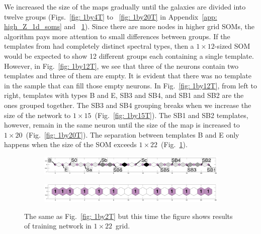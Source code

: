             We increased the size of the maps gradually until the galaxies are divided into twelve groups (Figs.~\ref{fig: 1by4T} to ~\ref{fig: 1by20T} in Appendix~\ref{app: high_Z_1d_soms} and ~\ref{fig: 1by22T}).
            Since there are more nodes in higher grid SOMs, the algorithm 
            pays more attention to small differences between groups.
            If the templates from  had completely distinct spectral types, then a $1\times12$-sized SOM would be expected to show 12 different groups each containing a single template.
            However, in Fig.~\ref{fig: 1by12T}, we see that three of the neurons contain two templates and three of them are empty.
            It is evident that there was no template in the  sample that can fill those empty neurons.
            In Fig.~\ref{fig: 1by12T}, from left to right, templates with types B and E, SB3 and SB4, and SB1 and SB2 are the ones grouped together. 
            The SB3 and SB4 grouping breaks when we increase the size of the network to $1\times15$~(Fig.~\ref{fig: 1by15T}).
            The SB1 and SB2 templates, however, remain in the same neuron until the size of the map is increased to $1\times20$~(Fig.~\ref{fig: 1by20T}).
            The separation between templates B and E only happens when the size of the SOM exceeds $1\times22$~(Fig.~\ref{fig: 1by22T}).
        \begin{figure}
            \begin{subfigure}[b]{\textwidth}
                \centering
                \includegraphics[width=\textwidth]{../image_paper2/1d/dist_1_by_22.png}
            \end{subfigure}
            \hfill
            \begin{subfigure}[b]{\textwidth}
                \includegraphics[width=\textwidth]{../image_paper2/1d/hit_t_1_by_22.png}
            \end{subfigure}
            \caption[Results of training network in $1\times22$~grid]{The same as Fig.~\ref{fig: 1by2T} but this time the figure shows results of training network in $1\times22$~grid.}
            \label{fig: 1by22T}
        \end{figure} 
    
